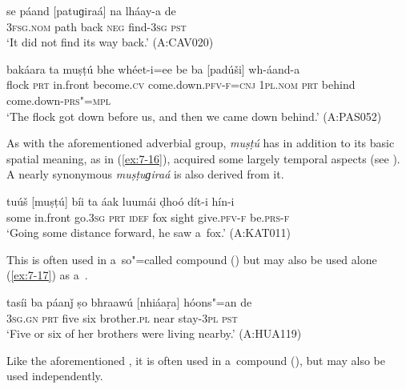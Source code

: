 \begin{exe}
\ex
\label{ex:7-14}
\gll se páand [patuɡiraá] na lháay-a de  \\
\textsc{3fsg.nom} path back  \textsc{neg} find-\textsc{3sg} \textsc{pst}\\
\glt `It did not find its way back.' (A:CAV020)

\ex
\label{ex:7-15}
\gll bakáara ta muṣṭú bhe whéet-i=ee  be ba [padúši] wh-áand-a \\
flock \textsc{prt} in.front become.\textsc{cv} come.down.\textsc{pfv-f=cnj} \textsc{1pl.nom} \textsc{prt} behind come.down-\textsc{prs"=mpl}\\
\glt `The flock got down before us, and then we came down behind.' (A:PAS052)
\end{exe}

 As with the aforementioned adverbial group, \textit{muṣṭú} has in addition to its basic spatial meaning, as in (\ref{ex:7-16}), acquired some largely temporal aspects (see ). A nearly synonymous \textit{muṣṭuɡiraá} is also derived from it. 

\begin{exe}
\ex
\label{ex:7-16}
\gll tuúš [muṣṭú] bíi ta áak luumái ḍhoó dít-i hín-i \\
some in.front go.\textsc{3sg} \textsc{prt} \textsc{idef} fox sight give.\textsc{pfv-f} be.\textsc{prs-f}\\
\glt `Going some distance forward, he saw a~fox.' (A:KAT011)
\end{exe}

 This  is often used in a~so"=called compound  () but may also be used alone (\ref{ex:7-17}) as a~.
\begin{exe}
\ex
\label{ex:7-17}
\gll tasíi ba páanǰ ṣo bhraawú [nhiáaṛa] hóons"=an de \\
\textsc{3sg.gn} \textsc{prt} five six brother.\textsc{pl} near stay-\textsc{3pl} \textsc{pst}\\
\glt `Five or six of her brothers were living nearby.' (A:HUA119)
\end{exe}

 Like the aforementioned , it is often used in a~compound  (), but may also be used independently.

